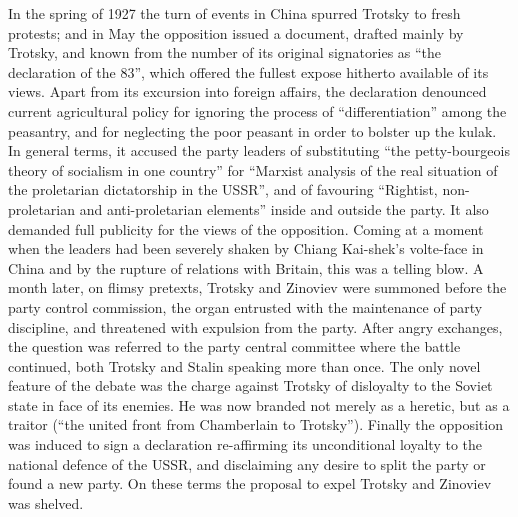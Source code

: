 In the spring of 1927 the turn of events in China spurred Trotsky to fresh protests; and in May the opposition issued a document, drafted mainly by Trotsky, and known from the number of its original signatories as ``the declaration of the 83'', which offered the fullest expose hitherto available of its views. Apart from its excursion into foreign affairs, the declaration denounced current agricultural policy for ignoring the process of ``differentiation'' among the peasantry, and for neglecting the poor peasant in order to bolster up the kulak. In general terms, it accused the party leaders of substituting ``the petty-bourgeois theory of socialism in one country'' for ``Marxist analysis of the real situation of the proletarian dictatorship in the USSR'', and of favouring ``Rightist, non-proletarian and anti-proletarian elements'' inside and outside the party. It also demanded full publicity for the views of the opposition. Coming at a moment when the leaders had been severely shaken by Chiang Kai-shek's volte-face in China and by the rupture of relations with Britain, this was a telling blow. A month later, on flimsy pretexts, Trotsky and Zinoviev were summoned before the party control commission, the organ entrusted with the maintenance of party discipline, and threatened with expulsion from the party. After angry exchanges, the question was referred to the party central committee where the battle continued, both Trotsky and Stalin speaking more than once. The only novel feature of the debate was the charge against Trotsky of disloyalty to the Soviet state in face of its enemies. He was now branded not merely as a heretic, but as a traitor (``the united front from Chamberlain to Trotsky''). Finally the opposition was induced to sign a declaration re-affirming its unconditional loyalty to the national defence of the USSR, and disclaiming any desire to split the party or found a new party. On these terms the proposal to expel Trotsky and Zinoviev was shelved. 

